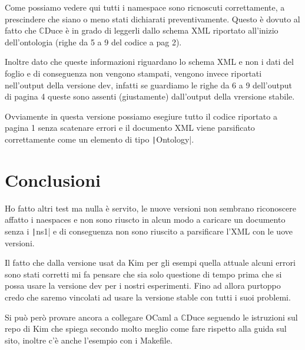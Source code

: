 \documentclass[]{article}
\newcommand{\cduce}{$\mathbb {C}$Duce\xspace}
\begin{document}
Come possiamo vedere qui tutti i namespace sono ricnoscuti correttamente, a prescindere che siano o meno stati dichiarati preventivamente. Questo è dovuto al fatto che \cduce è in grado di leggerli dallo schema XML riportato all'inizio dell'ontologia (righe da 5 a 9 del codice a pag 2). 

Inoltre dato che queste informazioni riguardano lo schema XML e non i dati del foglio e di conseguenza non vengono stampati, vengono invece riportati nell'output della versione dev, infatti se guardiamo le righe da 6 a 9 dell'output di pagina 4 queste sono assenti (giustamente) dall'output della vrersione stabile.

Ovviamente in questa versione possiamo esegiure tutto il codice riportato a pagina 1 senza scatenare errori e il documento XML viene parsificato correttamente come un elemento di tipo \texttt|Ontology|.

\section{Conclusioni}
Ho fatto altri test  ma nulla è servito, le nuove versioni non sembrano riconoscere affatto i naespaces e non sono riuscto in alcun modo a caricare un documento senza i \texttt|ns1| e di conseguenza non sono riuscito a parsificare l'XML con le uove versioni.

Il fatto che dalla versione usat da Kim per gli esempi  quella attuale alcuni errori sono stati corretti mi fa pensare che sia solo questione di tempo prima che si possa usare la versione dev per i nostri esperimenti. Fino ad allora purtoppo credo che saremo vincolati ad usare la versione stable con tutti i suoi problemi.

Si può però provare ancora a collegare OCaml a \cduce seguendo le istruzioni sul repo di Kim che spiega secondo molto meglio come fare rispetto alla guida sul sito, inoltre c'è anche l'esempio con i Makefile. 
\end{document}

